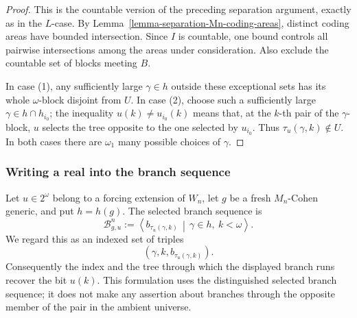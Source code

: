 \documentclass[a4paper,11pt]{article}
\begin{document}
\begin{proof}
This is the countable version of the preceding separation argument, exactly as
in the $L$-case.  By Lemma~\ref{lemma-separation-Mn-coding-areas}, distinct
coding areas have bounded intersection.  Since $I$ is countable, one bound
controls all pairwise intersections among the areas under consideration.  Also
exclude the countable set of blocks meeting $B$.

In case (1), any sufficiently large $\gamma\in h$ outside these exceptional
sets has its whole $\omega$-block disjoint from $U$.  In case (2), choose
such a sufficiently large $\gamma\in h\cap h_{i_0}$; the inequality
$u(k)\neq u_{i_0}(k)$ means that, at the $k$-th pair of the $\gamma$-block,
$u$ selects the tree opposite to the one selected by $u_{i_0}$.  Thus
$\tau_u(\gamma,k)\notin U$.  In both cases there are $\omega_1$ many possible
choices of $\gamma$.
\end{proof}

\subsubsection*{Writing a real into the branch sequence}

Let $u\in2^\omega$ belong to a forcing extension of $W_n$, let $g$ be a fresh
$M_n$-Cohen generic, and put $h=h(g)$.  The selected branch sequence is
\[
   \mathcal B^n_{g,u}
   :=\left\langle
      b_{\tau_u(\gamma,k)}
      \,\middle|\,
      \gamma\in h,\ k<\omega
   \right\rangle.
\]
We regard this as an indexed set of triples
\[
   (\gamma,k,b_{\tau_u(\gamma,k)}).
\]
Consequently the index and the tree through which the displayed branch runs
recover the bit $u(k)$.  This formulation uses the distinguished selected
branch sequence; it does not make any assertion about branches through the
opposite member of the pair in the ambient universe.
\end{document}
